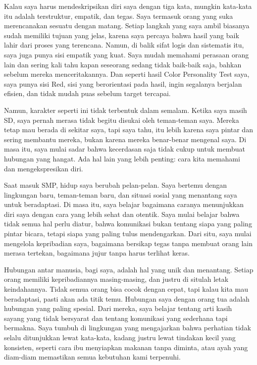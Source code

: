 \documentclass[
  letterpaper,
  DIV=11,
  numbers=noendperiod]{scrreprt}
\begin{document}
Kalau saya harus mendeskripsikan diri saya dengan tiga kata, mungkin
kata-kata itu adalah terstruktur, empatik, dan tegas. Saya termasuk
orang yang suka merencanakan sesuatu dengan matang. Setiap langkah yang
saya ambil biasanya sudah memiliki tujuan yang jelas, karena saya
percaya bahwa hasil yang baik lahir dari proses yang terencana. Namun,
di balik sifat logis dan sistematis itu, saya juga punya sisi empatik
yang kuat. Saya mudah memahami perasaan orang lain dan sering kali tahu
kapan seseorang sedang tidak baik-baik saja, bahkan sebelum mereka
menceritakannya. Dan seperti hasil Color Personality Test saya, saya
punya sisi Red, sisi yang berorientasi pada hasil, ingin segalanya
berjalan efisien, dan tidak mudah puas sebelum target tercapai.

Namun, karakter seperti ini tidak terbentuk dalam semalam. Ketika saya
masih SD, saya pernah merasa tidak begitu disukai oleh teman-teman saya.
Mereka tetap mau berada di sekitar saya, tapi saya tahu, itu lebih
karena saya pintar dan sering membantu mereka, bukan karena mereka
benar-benar mengenal saya. Di masa itu, saya mulai sadar bahwa
kecerdasan saja tidak cukup untuk membuat hubungan yang hangat. Ada hal
lain yang lebih penting: cara kita memahami dan mengekspresikan diri.

Saat masuk SMP, hidup saya berubah pelan-pelan. Saya bertemu dengan
lingkungan baru, teman-teman baru, dan situasi sosial yang menantang
saya untuk beradaptasi. Di masa itu, saya belajar bagaimana caranya
menunjukkan diri saya dengan cara yang lebih sehat dan otentik. Saya
mulai belajar bahwa tidak semua hal perlu diatur, bahwa komunikasi bukan
tentang siapa yang paling pintar bicara, tetapi siapa yang paling tulus
mendengarkan. Dari situ, saya mulai mengelola kepribadian saya,
bagaimana bersikap tegas tanpa membuat orang lain merasa tertekan,
bagaimana jujur tanpa harus terlihat keras.

Hubungan antar manusia, bagi saya, adalah hal yang unik dan menantang.
Setiap orang memiliki kepribadiannya masing-masing, dan justru di
situlah letak keindahannya. Tidak semua orang bisa cocok dengan cepat,
tapi kalau kita mau beradaptasi, pasti akan ada titik temu. Hubungan
saya dengan orang tua adalah hubungan yang paling spesial. Dari mereka,
saya belajar tentang arti kasih sayang yang tidak bersyarat dan tentang
komunikasi yang sederhana tapi bermakna. Saya tumbuh di lingkungan yang
mengajarkan bahwa perhatian tidak selalu ditunjukkan lewat kata-kata,
kadang justru lewat tindakan kecil yang konsisten, seperti cara ibu
menyiapkan makanan tanpa diminta, atau ayah yang diam-diam memastikan
semua kebutuhan kami terpenuhi.
\end{document}
